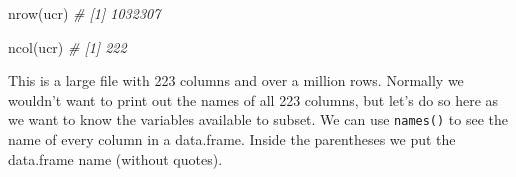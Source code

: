 \documentclass[
  a4paper,
]{krantz}
\makeatletter
\newenvironment{Shaded}{\begin{snugshade}}{\end{snugshade}}
\newcommand{\CommentTok}[1]{\textcolor[rgb]{0.37,0.37,0.37}{\textit{#1}}}
\newcommand{\FunctionTok}[1]{\textcolor[rgb]{0,0,0}{#1}}
\newcommand{\NormalTok}[1]{#1}
\newenvironment{kframe}{%
\medskip{}
\setlength{\fboxsep}{.8em}
 \def\at@end@of@kframe{}%
 \ifinner\ifhmode%
  \def\at@end@of@kframe{\end{minipage}}%
  \begin{minipage}{\columnwidth}%
 \fi\fi%
 \def\FrameCommand##1{\hskip\@totalleftmargin \hskip-\fboxsep
 \colorbox{shadecolor}{##1}\hskip-\fboxsep
     \hskip-\linewidth \hskip-\@totalleftmargin \hskip\columnwidth}%
 \MakeFramed {\advance\hsize-\width
   \@totalleftmargin\z@ \linewidth\hsize
   \@setminipage}}%
 {\par\unskip\endMakeFramed%
 \at@end@of@kframe}
\renewenvironment{Shaded}{\begin{kframe}}{\end{kframe}}
\makeatother
\begin{document}
\begin{Shaded}
\begin{Highlighting}[]
\FunctionTok{nrow}\NormalTok{(ucr)}
\CommentTok{\# [1] 1032307}
\end{Highlighting}
\end{Shaded}

\begin{Shaded}
\begin{Highlighting}[]
\FunctionTok{ncol}\NormalTok{(ucr)}
\CommentTok{\# [1] 222}
\end{Highlighting}
\end{Shaded}

This is a large file with 223 columns and over a million
rows. Normally we wouldn't want to print out the names of
all 223 columns, but let's do so here as we want to know the
variables available to subset. We can use \texttt{names()}
to see the name of every column in a data.frame. Inside the
parentheses we put the data.frame name (without quotes).
\end{document}
